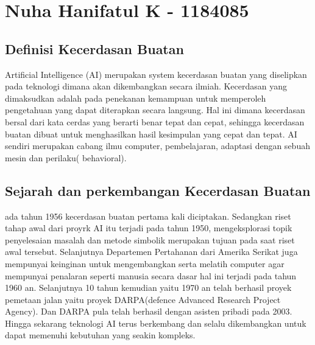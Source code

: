\section{Nuha Hanifatul K - 1184085}
\subsection{Definisi Kecerdasan Buatan}
 \hspace{1cm}Artificial Intelligence (AI) merupakan system kecerdasan buatan yang diselipkan pada teknologi dimana akan dikembangkan secara ilmiah. Kecerdasan yang dimaksudkan adalah pada penekanan kemampuan untuk memperoleh pengetahuan yang dapat diterapkan secara langsung. Hal ini dimana kecerdasan bersal dari kata cerdas yang berarti benar tepat dan cepat, sehingga kecerdasan buatan dibuat untuk menghasilkan hasil kesimpulan yang cepat dan tepat. AI sendiri merupakan cabang ilmu computer, pembelajaran, adaptasi dengan sebuah mesin dan perilaku( behavioral).

\subsection{Sejarah dan perkembangan Kecerdasan Buatan}
\hspace{1cm} ada tahun 1956 kecerdasan buatan pertama kali diciptakan. Sedangkan riset tahap awal dari proyrk AI itu terjadi pada tahun 1950, mengeksplorasi topik penyelesaian masalah dan metode simbolik merupakan tujuan pada saat riset awal tersebut.
Selanjutnya Departemen Pertahanan dari Amerika Serikat juga mempunyai keinginan untuk mengembangkan serta melatih computer agar mempunyai penalaran seperti manusia secara dasar hal ini terjadi pada tahun 1960 an. Selanjutnya 10 tahun kemudian yaitu 1970 an telah berhasil proyek pemetaan jalan yaitu proyek DARPA(defence Advanced Research Project Agency). Dan DARPA pula telah berhasil dengan asisten pribadi pada 2003. Hingga sekarang teknologi AI terus berkembang dan selalu dikembangkan untuk dapat memenuhi kebutuhan yang seakin kompleks.

